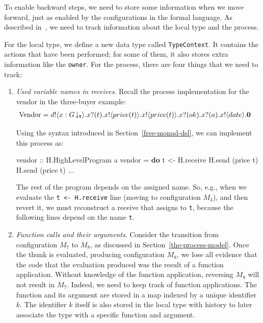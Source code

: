 \documentclass[runningheads,plain]{llncs}
\newenvironment{Shaded}{}{}
\newcommand{\KeywordTok}[1]{\textcolor[rgb]{0.00,0.44,0.13}{\textbf{#1}}}
\newcommand{\DataTypeTok}[1]{\textcolor[rgb]{0.56,0.13,0.00}{#1}}
\newcommand{\OtherTok}[1]{\textcolor[rgb]{0.00,0.44,0.13}{#1}}
\newcommand{\FunctionTok}[1]{\textcolor[rgb]{0.02,0.16,0.49}{#1}}
\newcommand{\NormalTok}[1]{#1}
\begin{document}
To enable backward steps, we need to store some information when we move forward, just as enabled by the configurations in the formal language.
As described in~\cite{DBLP:conf/ppdp/MezzinaP17}, we need to track information about the local type and the process.

For the local type, we define a new data type called \texttt{TypeContext}. It
contains the actions that have been performed; for some of them, it also
stores extra information like the \texttt{owner}.
For the process, there are four things that we need to track:

\begin{enumerate}
\def\labelenumi{\arabic{enumi}.}
\item \emph{Used variable names in receives}.
    Recall the process implementation for  the vendor in the three-buyer example:
  \begin{align*}
  \text{Vendor} & =  d ! \langle x:G\!\downarrow_{\mathtt{V}} \rangle .x ? (t) .x ! \langle price(t) \rangle .x ! \langle price(t) \rangle . x ? (ok) .x ? (a) . x ! \langle date \rangle .\mathbf{0}
  \end{align*}

  Using the syntax introduced in Section~\ref{free-monad-dsl}, we can implement this
  process as:
\begin{Shaded}
\begin{Highlighting}[]
\OtherTok{vendor ::} \DataTypeTok{H.HighLevelProgram}\NormalTok{ a}
\NormalTok{vendor }\FunctionTok{=} \KeywordTok{do} 
\NormalTok{    t }\OtherTok{<-}\NormalTok{ H.receive }
\NormalTok{    H.send (price t) }
\NormalTok{    H.send (price t) }
    \FunctionTok{...}
\end{Highlighting}
\end{Shaded}
  The rest of the program depends on the assigned name. So, e.g.,
  when we evaluate the \texttt{t\ \textless{}-\ H.receive} line
  (moving to configuration \(M_3\)), and then revert it, we must
  reconstruct a receive that assigns to \texttt{t}, because the
  following lines depend on the name \texttt{t}. \\

\item \emph{Function calls and their arguments}.
      Consider the transition from configuration $M_7$ to $M_8$, as discussed in Section~\ref{the-process-model}. Once the thunk
  is evaluated, producing configuration \(M_8\), we lose all evidence that the
  code that the evaluation produced was the result of a function
  application. 
  Without knowledge of the function application, reversing $M_8$ will
  not result in $M_7$. Indeed, we need to keep track of function
  applications. The function and its argument are stored in a map
  indexed by a unique identifier $k$. The identifier $k$ itself is also
  stored in the local type with history to later associate the type with
  a specific function and argument.


\end{enumerate}
\end{document}
